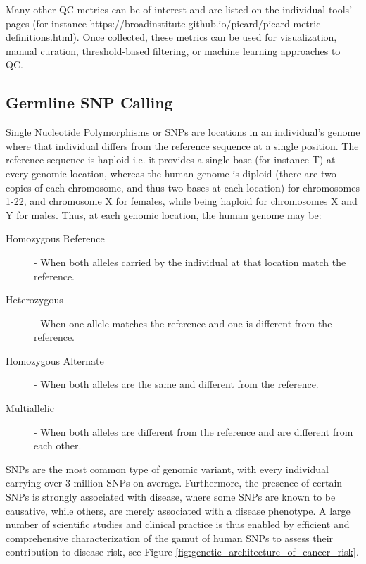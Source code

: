 Many other QC metrics can be of interest and are listed on the individual tools' pages (for instance https://broadinstitute.github.io/picard/picard-metric-definitions.html). Once collected, these metrics can be used for visualization, manual curation, threshold-based filtering, or machine learning approaches to QC.

\subsection{Germline SNP Calling}
\label{sec:bg_germline_snp_calling}

Single Nucleotide Polymorphisms or SNPs are locations in an individual's genome where that individual differs from the reference sequence at a single position. The reference sequence is haploid i.e. it provides a single base (for instance T) at every genomic location, whereas the human genome is diploid (there are two copies of each chromosome, and thus two bases at each location) for chromosomes 1-22, and chromosome X for females, while being haploid for chromosomes X and Y for males. Thus, at each genomic location, the human genome may be:

\begin{description}
    \item [Homozygous Reference] - When both alleles carried by the individual at that location match the reference.
    \item [Heterozygous] - When one allele matches the reference and one is different from the reference.
    \item [Homozygous Alternate] - When both alleles are the same and different from the reference.
    \item [Multiallelic] - When both alleles are different from the reference and are different from each other\autocite{hodgkinson2010human}.
\end{description}

SNPs are the most common type of genomic variant, with every individual carrying over 3 million SNPs on average\autocite{shen2013comprehensive}. Furthermore, the presence of certain SNPs is strongly associated with disease\autocite{wellcome2007genome}, where some SNPs are known to be causative\autocite{ingram1957gene}, while others, are merely associated with a disease phenotype\autocite{satake2009genome}. A large number of scientific studies\autocite{hirschhorn2005genome} and clinical practice\autocite{yang2013clinical} is thus enabled by efficient and comprehensive characterization of the gamut of human SNPs to assess their contribution to disease risk, see Figure \ref{fig:genetic_architecture_of_cancer_risk}.

